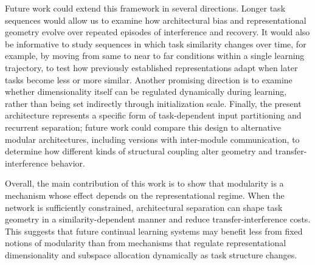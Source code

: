 \documentclass[letterpaper]{article}
\begin{document}
        Future work could extend this framework in several directions. Longer task sequences would allow us to examine how architectural bias and representational geometry evolve over repeated episodes of interference and recovery. It would also be informative to study sequences in which task similarity changes over time, for example, by moving from same to near to far conditions within a single learning trajectory, to test how previously established representations adapt when later tasks become less or more similar. Another promising direction is to examine whether dimensionality itself can be regulated dynamically during learning, rather than being set indirectly through initialization scale. Finally, the present architecture represents a specific form of task-dependent input partitioning and recurrent separation; future work could compare this design to alternative modular architectures, including versions with inter-module communication, to determine how different kinds of structural coupling alter geometry and transfer-interference behavior.
        
        Overall, the main contribution of this work is to show that modularity is a mechanism whose effect depends on the representational regime. When the network is sufficiently constrained, architectural separation can shape task geometry in a similarity-dependent manner and reduce transfer-interference costs. This suggests that future continual learning systems may benefit less from fixed notions of modularity than from mechanisms that regulate representational dimensionality and subspace allocation dynamically as task structure changes.


\end{document}
